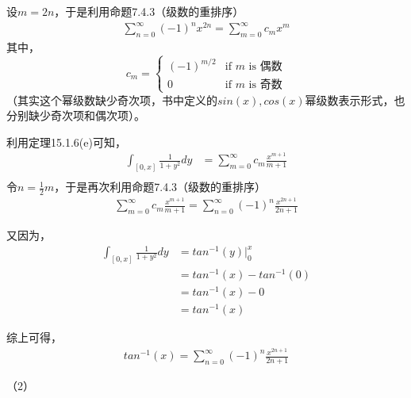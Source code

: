\documentclass{article}
\begin{document}
设$m = 2n$，于是利用命题7.4.3（级数的重排序）
\begin{align*}
  \sum \limits_{n = 0}^{\infty} (-1)^n x^{2n}
  =
  \sum \limits_{m = 0}^{\infty} c_m x^{m}
\end{align*}
其中，
\begin{equation*}
  c_m = \begin{cases}
    (-1)^{m/2} & \text{if } m \text{ is 偶数} \\
    0          & \text{if } m \text{ is 奇数}
  \end{cases}
\end{equation*}
（其实这个幂级数缺少奇次项，书中定义的$sin(x), cos(x)$幂级数表示形式，也分别缺少奇次项和偶次项）。

利用定理15.1.6(e)可知，
\begin{align*}
  \int_{[0, x]} \frac{1}{1 + y^2} dy
   & = \sum \limits_{m = 0}^{\infty} c_m \frac{x^{m + 1}}{m + 1} \\
\end{align*}
令$n = \frac{1}{2}m$，于是再次利用命题7.4.3（级数的重排序）
\begin{align*}
  \sum \limits_{m = 0}^{\infty} c_m \frac{x^{m + 1}}{m + 1}
  =
  \sum \limits_{n = 0}^{\infty} (-1)^n \frac{x^{2n + 1}}{2n + 1}
\end{align*}

又因为，
\begin{align*}
  \int_{[0, x]} \frac{1}{1 + y^2} dy
   & = tan^{-1}(y)|_0^x          \\
   & = tan^{-1}(x) - tan^{-1}(0) \\
   & = tan^{-1}(x) - 0           \\
   & = tan^{-1}(x)
\end{align*}

综上可得，
\begin{align*}
  tan^{-1}(x) = \sum \limits_{n = 0}^{\infty} (-1)^n \frac{x^{2n + 1}}{2n + 1}
\end{align*}

（2）
\end{document}

